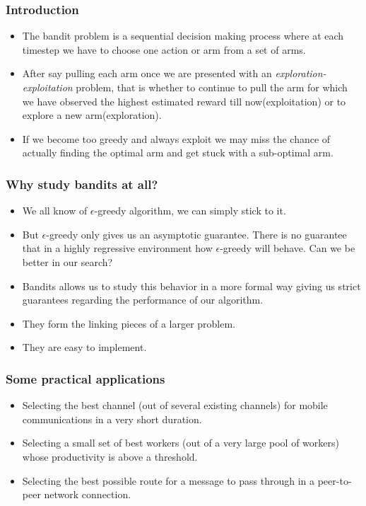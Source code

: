 \begin{frame}
\frametitle{Introduction}
\begin{itemize}
\item<1-> The bandit problem is a sequential decision making process where at each timestep we have to choose one action or arm from a set of arms. 
\item<2-> After say pulling each arm once we are presented with an \emph{exploration-exploitation}  problem, that is whether to continue to pull the arm for which we have observed the highest estimated reward till now(exploitation) or to explore a new arm(exploration). 
\item<3-> If we become too greedy and always exploit we may miss the chance of actually finding the optimal arm and get stuck with a sub-optimal arm.
\end{itemize}
\end{frame}

\begin{frame}
\frametitle{Why study bandits at all?}
\begin{itemize}
\item<1-> We all know of $\epsilon$-greedy algorithm, we can simply stick to it.
\item<2-> But $\epsilon$-greedy only gives us an asymptotic guarantee. There is no guarantee that in a highly regressive environment how $\epsilon$-greedy will behave. Can we be better in our search?
\item<3-> Bandits allows us to study this behavior in a more formal way giving us strict guarantees regarding the performance of our algorithm.
\item<4-> They form the linking pieces of a larger problem.
\item<5-> They are easy to implement.    
\end{itemize}
\end{frame}

\begin{frame}
\frametitle{Some practical applications}
\begin{itemize}
\item<1-> Selecting the best channel (out of several existing channels) for mobile communications in a very short duration.
\item<2-> Selecting a small set of best workers (out of a very large pool of workers) whose productivity is above a threshold.
\item<3-> Selecting the best possible route for a message to pass through in a peer-to-peer network connection.
\end{itemize}
\end{frame}
